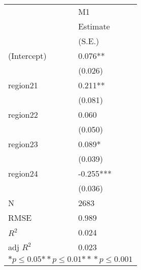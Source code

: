 \begin{tabular}{*{2}{l}}
\hline
                  & M1   \tabularnewline
                   &Estimate \tabularnewline
                 &(S.E.) \tabularnewline
 \hline
 \hline
   (Intercept)     &0.076** \tabularnewline
                 &(0.026)  \tabularnewline
   region21        &0.211** \tabularnewline
                 &(0.081)  \tabularnewline
   region22        &0.060 \tabularnewline
                 &(0.050)  \tabularnewline
   region23        &0.089* \tabularnewline
                 &(0.039)  \tabularnewline
   region24        &-0.255*** \tabularnewline
                 &(0.036)  \tabularnewline
 \hline
 N                 &2683       \tabularnewline
 RMSE             &0.989   \tabularnewline
 $R^2$             &0.024   \tabularnewline
 adj $R^2$         &0.023   \tabularnewline
 \hline
\hline
 
 \multicolumn{2}{c}{${*  p}\le 0.05$${*\!\!*  p}\le 0.01$${*\!\!*\!\!*  p}\le 0.001$}\tabularnewline
 \end{tabular}